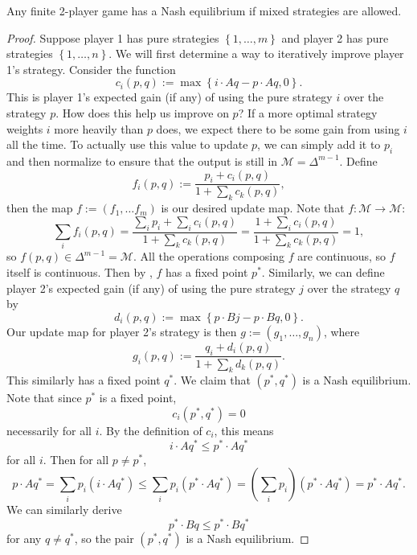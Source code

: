 \documentclass[twoside,10pt]{article}
\begin{document}
\begin{thrm}
	Any finite 2-player game has a Nash equilibrium if mixed strategies are allowed.
\end{thrm}
\begin{proof}
	Suppose player 1 has pure strategies $\left\{ 1, \dots, m \right\}$ and player 2 has pure strategies $\left\{ 1, \dots, n \right\}$. We will first determine a way to iteratively improve player 1's strategy. Consider the function
	\[
		c_i(p,q) := \max\left\{ i\cdot A q - p\cdot Aq, 0 \right\}.
	\] This is player 1's expected gain (if any) of using the pure strategy $i$ over the strategy $p$. How does this help us improve on $p$? If a more optimal strategy weights $i$ more heavily than $p$ does, we expect there to be some gain from using $i$ all the time. To actually use this value to update $p$, we can simply add it to $p_i$ and then normalize to ensure that the output is still in $\mathcal{M}=\Delta^{m-1}$. Define
	\[
		f_{i}(p,q) := \frac{p_i + c_i(p,q)}{1 + \sum_{k}c_{k}(p,q)} ,
	\] then the map $f := (f_1, \dots f_{m})$ is our desired update map. Note that $f:\mathcal{M} \to \mathcal{M}$:
	\[
		\sum_{i} f_{i}(p,q) = \frac{\sum_{i} p_i + \sum_i c_i(p,q)}{1 + \sum_{k}c_{k}(p,q)} = \frac{1 + \sum_i c_i(p,q)}{1 + \sum_{k}c_{k}(p,q)} = 1,
	\] so $f(p,q) \in \Delta^{m-1}=\mathcal{M}$. All the operations composing $f$ are continuous, so $f$ itself is continuous. Then by , $f$ has a fixed point $p^{*}$. Similarly, we can define player 2's expected gain (if any) of using the pure strategy $j$ over the strategy $q$ by
	\[
		d_{i}(p,q) := \max \left\{ p\cdot Bj - p\cdot Bq, 0 \right\}.
	\] Our update map for player 2's strategy is then $g := (g_1, \dots, g_{n})$, where
	\[
		g_{i}(p,q) := \frac{q_i + d_{i}(p,q)}{1 + \sum_{k} d_{k}(p,q)} .
	\] This similarly has a fixed point $q^{*}$. We claim that $(p^{*},q^{*})$ is a Nash equilibrium. Note that since $p^{*}$ is a fixed point,
	\[
		c_i(p^{*},q^{*}) = 0
	\] necessarily for all $i$. By the definition of $c_i$, this means
	\[
	i\cdot Aq^{*} \leq p^{*}\cdot Aq^{*}
	\] for all $i$. Then for all $p \neq p^{*}$,
	\[
		p\cdot Aq^{*} = \sum_i p_i (i \cdot Aq^{*}) \leq \sum_i p_i (p^{*}\cdot Aq^{*}) = \left( \sum_i p_i \right)\left( p^{*}\cdot Aq^{*} \right) = p^{*}\cdot Aq^{*}.
	\] We can similarly derive
	\[
	p^{*}\cdot Bq \leq p^{*}\cdot Bq^{*}
	\] for any $q \neq q^{*}$, so the pair $(p^{*},q^{*})$ is a Nash equilibrium.
\end{proof}

\end{document}
